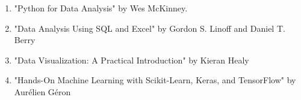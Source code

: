 \documentclass{article}
\begin{document}
{\begin{enumerate}
    \item "Python for Data Analysis" by Wes McKinney.\\
    \item "Data Analysis Using SQL and Excel" by Gordon S. Linoff and Daniel T. Berry\\
    \item "Data Visualization: A Practical Introduction" by Kieran Healy\\
    \item "Hands-On Machine Learning with Scikit-Learn, Keras, and TensorFlow" by Aurélien Géron
\end{enumerate}

}
\end{document}
